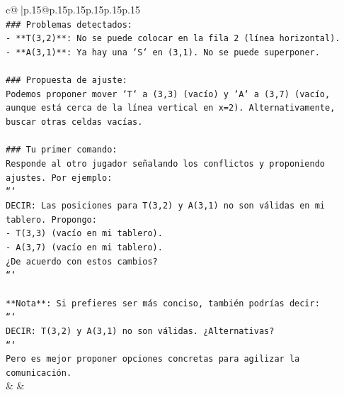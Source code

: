 \documentclass{article}
\begin{document}
{\begin{supertabular}{c@{$\;$}|p{.15\linewidth}@{}p{.15\linewidth}p{.15\linewidth}p{.15\linewidth}p{.15\linewidth}p{.15\linewidth}}
{{{\\ 
\texttt{\#\#\# Problemas detectados:} \\
\texttt{{-} **T(3,2)**: No se puede colocar en la fila 2 (línea horizontal).} \\
\texttt{{-} **A(3,1)**: Ya hay una `S` en (3,1). No se puede superponer.} \\
\\ 
\texttt{\#\#\# Propuesta de ajuste:} \\
\texttt{Podemos proponer mover `T` a (3,3) (vacío) y `A` a (3,7) (vacío, aunque está cerca de la línea vertical en x=2). Alternativamente, buscar otras celdas vacías.} \\
\\ 
\texttt{\#\#\# Tu primer comando:} \\
\texttt{Responde al otro jugador señalando los conflictos y proponiendo ajustes. Por ejemplo:} \\
\texttt{```} \\
\texttt{DECIR: Las posiciones para T(3,2) y A(3,1) no son válidas en mi tablero. Propongo:} \\
\texttt{{-} T(3,3) (vacío en mi tablero).} \\
\texttt{{-} A(3,7) (vacío en mi tablero).} \\
\texttt{¿De acuerdo con estos cambios?} \\
\texttt{```} \\
\\ 
\texttt{**Nota**: Si prefieres ser más conciso, también podrías decir:} \\
\texttt{```} \\
\texttt{DECIR: T(3,2) y A(3,1) no son válidas. ¿Alternativas?} \\
\texttt{```} \\
\texttt{Pero es mejor proponer opciones concretas para agilizar la comunicación.} \\
            }
        }
    }
    & & \\ \\


\end{supertabular}}
\end{document}
